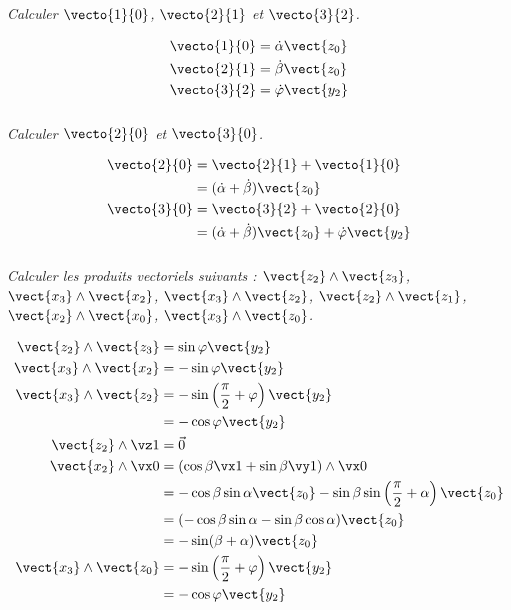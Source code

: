 \begin{multicols}{2}
\begin{corrige}
\end{corrige}\else\fi

\subparagraph{}
\textit{Calculer $\vecto{1}{0}$, $\vecto{2}{1}$ et $\vecto{3}{2}$.}
\ifprof
\begin{corrige}
\begin{align*}
\vecto{1}{0}&=\dot\alpha\vect{z_0}\\
\vecto{2}{1}&=\dot\beta\vect{z_0}\\
\vecto{3}{2}&=\dot\varphi\vect{y_2}\\
\end{align*}
\end{corrige}\else\fi



\subparagraph{}
\textit{Calculer $\vecto{2}{0}$ et $\vecto{3}{0}$.}
\ifprof
\begin{corrige}
\begin{align*}
\vecto{2}{0}&=\vecto{2}{1}+\vecto{1}{0}\\
	&=(\dot\alpha+\dot\beta)\vect{z_0}\\
\vecto{3}{0}&=\vecto{3}{2}+\vecto{2}{0}\\
	&=(\dot\alpha+\dot\beta)\vect{z_0}+\dot\varphi\vect{y_2}
\end{align*}

\end{corrige}\else\fi

\subparagraph{}
\textit{Calculer les produits vectoriels suivants : $\vect{z_2}\wedge\vect{z_3}$,
$\vect{x_3}\wedge\vect{x_2}$, $\vect{x_3}\wedge\vect{z_2}$,
$\vect{z_2}\wedge\vect{z_1}$, $\vect{x_2}\wedge\vect{x_0}$,
$\vect{x_3}\wedge\vect{z_0}$.}
\ifprof
\begin{corrige}

\begin{align*}
\vect{z_2} \wedge \vect{z_3} &=\sin\varphi \vect{y_2}\\
\vect{x_3} \wedge\vect{x_2} &= -\sin\varphi \vect{y_2}\\
\vect{x_3} \wedge \vect{z_2}&= -\sin\left(\dfrac{\pi}{2}+\varphi\right)\vect{y_2}\\
	&=-\cos\varphi\vect{y_2}\\
\vect{z_2} \wedge \vz1 &= \vec{0}\\
\vect{x_2} \wedge \vx0 &= \left(\cos\beta\vx1+\sin\beta\vy1\right)\wedge\vx0\\
	&=-\cos\beta\sin\alpha\vect{z_0} - \sin\beta\sin\left(\dfrac{\pi}{2}+\alpha\right)\vect{z_0}\\
	&=(-\cos\beta\sin\alpha-\sin\beta\cos\alpha)\vect{z_0}\\
	&=-\sin(\beta+\alpha)\vect{z_0}\\
\vect{x_3}\wedge\vect{z_0} &= -\sin\left(\dfrac{\pi}{2}+\varphi\right)\vect{y_2}\\
	&=-\cos\varphi\vect{y_2}
\end{align*}


\end{corrige}
\end{multicols}
